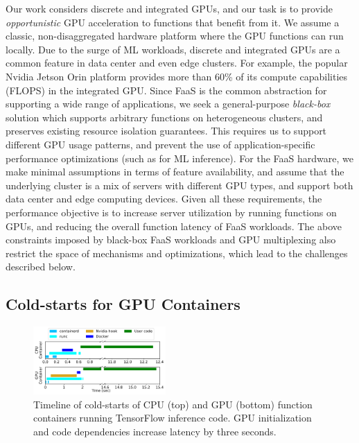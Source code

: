 Our work considers discrete and integrated GPUs, and our task is to provide \emph{opportunistic} GPU acceleration to functions that benefit from it.
We assume a classic, non-disaggregated hardware platform where the GPU functions can run locally. 
Due to the surge of ML workloads, discrete and integrated GPUs are a common feature in data center and even edge clusters. 
For example, the popular Nvidia Jetson Orin platform provides more than 60\% of its compute capabilities (FLOPS) in the integrated GPU.
Since FaaS is the common abstraction for supporting a wide range of applications, we seek a general-purpose \emph{black-box} solution which supports arbitrary functions on heterogeneous clusters, and preserves existing resource isolation guarantees. 
This requires us to support different GPU usage patterns, and prevent the use of application-specific performance optimizations (such as for ML inference). 
For the FaaS hardware, we make minimal assumptions in terms of feature availability, and assume that the underlying cluster is a mix of servers with different GPU types, and support both data center and edge computing devices. 
Given all these requirements, the performance objective is to increase server utilization by running functions on GPUs, and reducing the overall function latency of FaaS workloads. 
The above constraints imposed by black-box FaaS workloads and GPU multiplexing also restrict the space of mechanisms and optimizations, which lead to the challenges described below. 



\subsection{Cold-starts for GPU Containers}

\begin{figure}
  \includegraphics[width=0.45\textwidth]{../graphs/coldstart/combined_timeline.pdf}
  \vspace*{-0.35cm}
  \caption{Timeline of cold-starts of CPU (top) and GPU (bottom) function containers running TensorFlow inference code. 
    GPU initialization and code dependencies increase latency by three seconds.}
    \label{fig:cold-timeline}
\vspace*{-0.3cm}
\end{figure}

